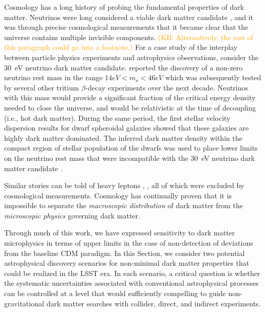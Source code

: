 \documentclass[modern,linenumbers]{aastex62}
\newcommand{\Comment}[3]{\textcolor{#1}{(#2: #3)}}
\newcommand{\KB}[1]{\Comment{orange}{KB}{#1}} %
\begin{document}
Cosmology has a long history of probing the fundamental properties of dark matter.
Neutrinos were long considered a viable dark matter candidate \citep[\eg,][]{Kolb:1988}, and it was through precise cosmological measurements that it became clear that the universe contains multiple invisible components.
\KB{Alternatively, the rest of this paragraph could go into a footnote.}
For a case study of the interplay between particle physics experiments and astrophysics observations, consider the 30~eV neutrino dark matter candidate.
\citet{Lyubimov:1980un} reported the discovery of a non-zero neutrino rest mass in the range $14 \unit{eV} < m_{\nu} < 46 \unit{eV}$ which was subsequently tested by several other tritium $\beta$-decay experiments over the next decade.
Neutrinos with this mass would provide a significant fraction of the critical energy density needed to close the universe, and would be relativistic at the time of decoupling (i.e., hot dark matter).
During the same period, the first stellar velocity dispersion results for dwarf spheroidal galaxies showed that these galaxies are highly dark matter dominated.
The inferred dark matter density within the compact region of stellar population of the dwarfs was used to place lower limits on the neutrino rest mass that were incompatible with the 30~eV neutrino dark matter candidate \citep{Aaronson:1983,Gerhard:1992}.

Similar stories can be told of heavy leptons \citep{Gunn:1978}, , all of which were excluded by cosmological measurements.
Cosmology has continually proven that it is impossible to separate the \emph{macroscopic distribution} of dark matter from the \emph{microscopic physics} governing dark matter.


Through much of this work, we have expressed sensitivity to dark matter microphysics in terms of upper limits in the case of non-detection of deviations from the baseline CDM paradigm.
In this Section, we consider two potential astrophysical discovery scenarios for non-minimal dark matter properties that could be realized in the LSST era.
In each scenario, a critical question is whether the systematic uncertainties associated with conventional astrophysical processes can be controlled at a level that would sufficiently compelling to guide non-gravitational dark matter searches with collider, direct, and indirect experiments.
\end{document}
